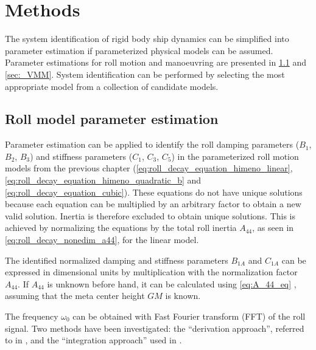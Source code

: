 \chapter{Methods\label{ch:methods}}
The system identification of rigid body ship dynamics can be simplified into parameter estimation if parameterized physical models can be assumed. Parameter estimations for roll motion and manoeuvring are presented in \ref{sec:_roll} and \ref{sec:_VMM}. System identification can be performed by selecting the most appropriate model from a collection of candidate models.

\section{Roll model parameter estimation} \label{sec:_roll}
\noindent Parameter estimation can be applied to identify the roll damping parameters ($B_1$, $B_2$, $B_3$) and stiffness parameters ($C_1$, $C_3$, $C_5$) in the parameterized roll motion models from the previous chapter (\autoref{eq:roll_decay_equation_himeno_linear}, \autoref{eq:roll_decay_equation_himeno_quadratic_b} and \autoref{eq:roll_decay_equation_cubic}). These equations do not have unique solutions because each equation can be multiplied by an arbitrary factor to obtain a new valid solution. Inertia is therefore excluded to obtain unique solutions. This is achieved by normalizing the equations by the total roll inertia $A_{44}$, as seen in \autoref{eq:roll_decay_nonedim_a44}, for the linear model.



\noindent The identified normalized damping and stiffness parameters $B_{1A}$ and $C_{1A}$ can be expressed in dimensional units by multiplication with the normalization factor $A_{44}$. If $A_{44}$ is unknown before hand, it can be calculated using \autoref{eq:A_44_eq} \cite{piehl_ship_2016}, assuming that the meta center height $GM$ is known.


\noindent The frequency $\omega_0$ can be obtained with Fast Fourier transform (FFT) of the roll signal. 
Two methods have been investigated: the ``derivation approach'', referred to in \parencite{imo_1200_2006}, and the ``integration approach'' used in \cite{soder_assessment_2019}. 

